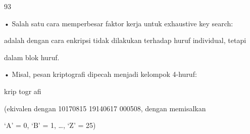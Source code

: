\documentclass{article}
\begin{document}

93

• Salah satu cara memperbesar faktor kerja untuk exhaustive key search: 

adalah dengan cara enkripsi tidak dilakukan terhadap huruf individual, tetapi 

dalam blok huruf. 

• Misal, pesan kriptografi dipecah menjadi kelompok 4-huruf:  


krip togr afi

 (ekivalen dengan 10170815  19140617  000508, dengan memisalkan 

                ‘A’ = 0, ‘B’ = 1, …, ‘Z’ = 25)
\end{document}
